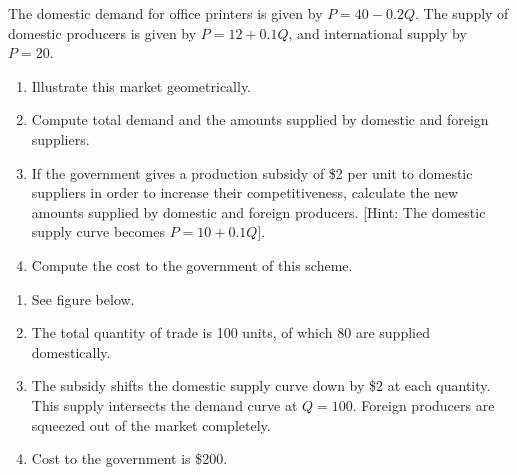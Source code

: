 \begin{enumialphparenastyle}
\begin{ex}\label{ex:ch15ex5}
The domestic demand for office printers is given by $P=40-0.2Q$. The supply of domestic producers is given by $P=12+0.1Q$, and international supply by $P=20$. 
\begin{enumerate}
\item  Illustrate this market geometrically.
\item  Compute total demand and the amounts supplied by domestic and foreign suppliers.
\item  If the government gives a production subsidy of \$2 per unit to domestic suppliers in order to increase their competitiveness, calculate the new amounts supplied by domestic and foreign producers. [Hint: The domestic supply curve becomes $P=10+0.1Q$].
\item  Compute the cost to the government of this scheme.
\end{enumerate}
\begin{sol}
\begin{enumerate}
	\item	See figure below.
	\item	The total quantity of trade is 100 units, of which 80 are supplied domestically.
	\item	The subsidy shifts the domestic supply curve down by \$2 at each quantity. This supply intersects the demand curve at $Q=100$. Foreign producers are squeezed out of the market completely.
	\item	Cost to the government is \$200.
\end{enumerate}
\begin{center}
\end{center}
\end{sol}
\end{ex}
	

\end{enumialphparenastyle}
